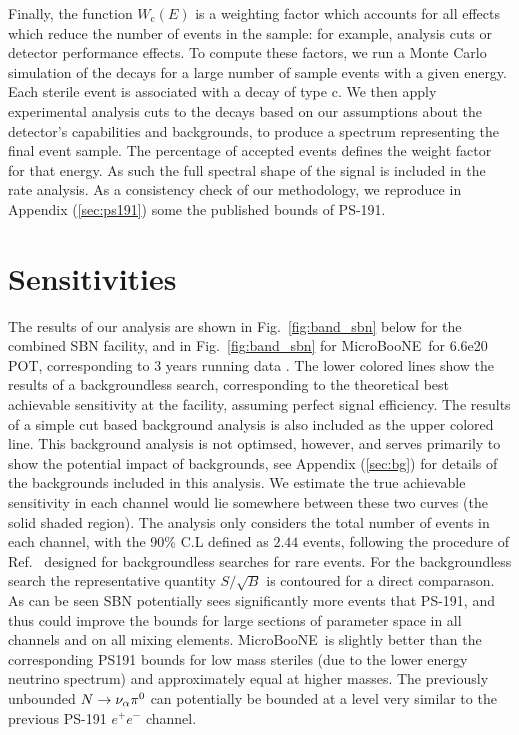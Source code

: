 \documentclass[11pt, a4paper]{article}
\newcommand{\reffig}[1]{Fig.~\ref{#1}}
\newcommand{\refref}[1]{Ref.~\cite{#1}}
\def\muboone{MicroBooNE}
\def\ster{\ensuremath N}
\begin{document}
%
Finally, the function $W_\text{c}(E)$ is a weighting factor which accounts for
all effects which reduce the number of events in the sample: for example,
analysis cuts or detector performance effects.
%
To compute these factors, we run a Monte Carlo simulation of the decays for a
large number of sample events with a given energy. Each sterile event is
associated with a decay of type $\text{c}$. We then apply experimental analysis
cuts to the decays based on our assumptions about the detector's capabilities
and backgrounds, to produce a spectrum representing the final event sample. The
percentage of accepted events defines the weight factor for that energy. As such the full spectral shape of the signal is included in the rate analysis. As a consistency check of our methodology, we reproduce in Appendix (\ref{sec:ps191}) some
the published bounds of PS-191. 

\section{Sensitivities\label{sec:sensitivity}}
%
The results of our analysis are shown in \reffig{fig:band_sbn} below for the
combined SBN facility, and in \reffig{fig:band_sbn} for \muboone\ for 6.6e20
POT, corresponding to 3 years running data . The lower colored lines show the
results of a backgroundless search, corresponding to the theoretical best
achievable sensitivity at the facility, assuming perfect signal efficiency. The
results of a simple cut based background analysis is also included as the upper
colored line. This background analysis is not optimsed, however, and serves
primarily to show the potential impact of backgrounds, see Appendix
(\ref{sec:bg}) for details of the backgrounds included in this analysis. We
estimate the true achievable sensitivity in each channel would lie somewhere
between these two curves (the solid shaded region). The analysis only considers
the total number of events in each channel, with the 90\% C.L defined as $2.44$
events, following the procedure of \refref{Feldman:1997qc} designed for
backgroundless searches for rare events. For the backgroundless search the
representative quantity $S/\sqrt{B}$ is contoured for a direct comparason.  \\

As can be seen SBN potentially sees significantly more events that PS-191, and
thus could improve the bounds for large sections of parameter space in all
channels and on all mixing elements. \muboone\ is slightly better than the
corresponding PS191 bounds for low mass steriles (due to the lower energy
neutrino spectrum) and approximately equal at higher masses. The previously
unbounded $\ster \rightarrow \nu_\alpha \pi^0$ can potentially be bounded at a
level very similar to the previous PS-191 $e^+ e^-$ channel. 
\end{document}
